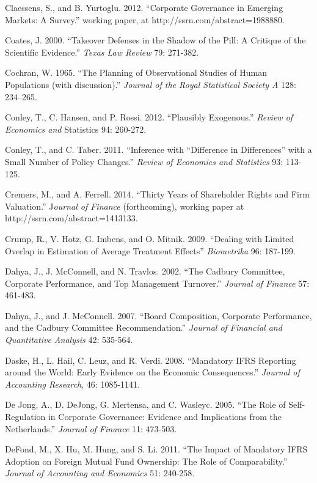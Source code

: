 \noindent Claessens, S., and B. Yurtoglu. 2012. ``Corporate Governance in Emerging Markets:  A Survey.'' working paper, at http://ssrn.com/abstract=1988880.

\noindent Coates, J. 2000.  ``Takeover Defenses in the Shadow of the Pill:  A Critique of the Scientific Evidence.''  \textit{Texas Law Review} 79: 271-382.

\noindent Cochran, W. 1965. ``The Planning of Observational Studies of Human Populations (with discussion).''  \textit{Journal of the Royal Statistical Society A} 128: 234--265.

\noindent Conley, T., C. Hansen, and P. Rossi. 2012. ``Plausibly Exogenous.'' \textit{Review of Economics and }Statistics 94: 260-272. 

\noindent Conley, T., and C. Taber. 2011. ``Inference with ``Difference in Differences'' with a Small Number of Policy Changes.''  \textit{Review of Economics and Statistics} 93: 113-125.

\noindent Cremers, M., and A. Ferrell. 2014. ``Thirty Years of Shareholder Rights and Firm Valuation.'' J\textit{ournal of Finance }(forthcoming), working paper at http://ssrn.com/abstract=1413133.

\noindent Crump, R., V. Hotz, G. Imbens, and O. Mitnik. 2009. ``Dealing with Limited Overlap in Estimation of Average Treatment Effects''  \textit{Biometrika} 96: 187-199.

\noindent Dahya, J., J. McConnell, and N. Travlos. 2002. ``The Cadbury Committee, Corporate Performance, and Top Management Turnover.'' \textit{Journal of Finance} 57: 461-483.

\noindent Dahya, J., and J. McConnell. 2007. ``Board Composition, Corporate Performance, and the Cadbury Committee Recommendation.'' \textit{Journal of Financial and Quantitative Analysis }42: 535-564.

\noindent Daske, H., L. Hail, C. Leuz, and R. Verdi. 2008. ``Mandatory IFRS Reporting around the World: Early Evidence on the Economic Consequences.'' \textit{Journal of Accounting Research}, 46: 1085-1141.

\noindent De Jong,  A., D. DeJong, G. Mertensa, and C. Wasleyc. 2005. ``The Role of Self-Regulation in Corporate Governance: Evidence and Implications from the Netherlands.'' \textit{Journal of Finance} 11: 473-503. 

\noindent DeFond, M., X. Hu, M. Hung, and S. Li. 2011. ``The Impact of Mandatory IFRS Adoption on Foreign Mutual Fund Ownership: The Role of Comparability.''  \textit{Journal of Accounting and Economics} 51: 240-258.

